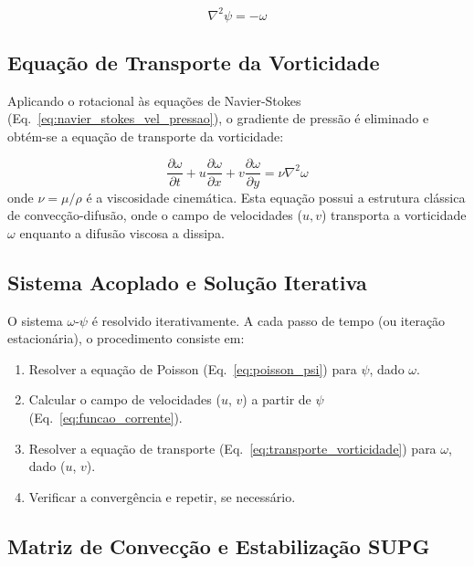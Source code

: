 \begin{equation}
\nabla^2 \psi = -\omega
\label{eq:poisson_psi}
\end{equation}

\subsection{Equação de Transporte da Vorticidade}

Aplicando o rotacional às equações de Navier-Stokes (Eq.~\ref{eq:navier_stokes_vel_pressao}), o gradiente de pressão é eliminado e obtém-se a equação de transporte da vorticidade:

\begin{equation}
\frac{\partial \omega}{\partial t} + u \frac{\partial \omega}{\partial x} + v \frac{\partial \omega}{\partial y} = \nu \nabla^2 \omega
\label{eq:transporte_vorticidade}
\end{equation}
onde $\nu = \mu/\rho$ é a viscosidade cinemática. Esta equação possui a estrutura clássica de convecção-difusão, onde o campo de velocidades ($u, v$) transporta a vorticidade $\omega$ enquanto a difusão viscosa a dissipa.

\subsection{Sistema Acoplado e Solução Iterativa}

O sistema $\omega$-$\psi$ é resolvido iterativamente. A cada passo de tempo (ou iteração estacionária), o procedimento consiste em:

\begin{enumerate}
    \item Resolver a equação de Poisson (Eq.~\ref{eq:poisson_psi}) para $\psi$, dado $\omega$.
    \item Calcular o campo de velocidades ($u$, $v$) a partir de $\psi$ (Eq.~\ref{eq:funcao_corrente}).
    \item Resolver a equação de transporte (Eq.~\ref{eq:transporte_vorticidade}) para $\omega$, dado ($u$, $v$).
    \item Verificar a convergência e repetir, se necessário.
\end{enumerate}

\subsection{Matriz de Convecção e Estabilização SUPG}
\label{sec:supg}

